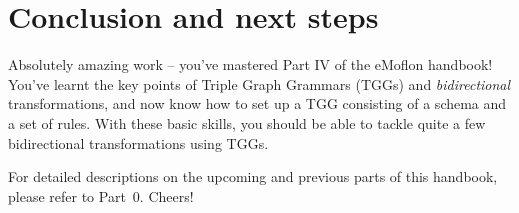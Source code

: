 \section{Conclusion and next steps}
\genHeader

\vspace{0.5cm}

Absolutely amazing work -- you've mastered Part IV of the eMoflon handbook! You've learnt the key points of Triple Graph Grammars (TGGs) and \emph{bidirectional} transformations, and now know how to set up a TGG consisting of a schema and a set of rules. 
With these basic skills, you should be able to tackle quite a few bidirectional transformations using TGGs.

For detailed descriptions on the upcoming and previous parts of this handbook, please refer to Part~0.
Cheers!


